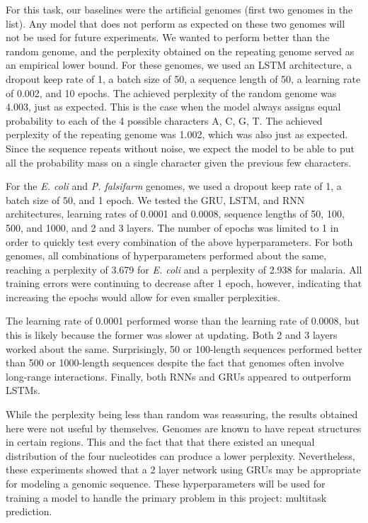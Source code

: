 \documentclass{article} %
\begin{document}
For this task, our baselines were the artificial genomes (first two genomes in the list). Any model that does not perform as expected on these two genomes will not be used for future experiments. We wanted to perform better than the random genome, and the perplexity obtained on the repeating genome served as an empirical lower bound. For these genomes, we used an LSTM architecture, a dropout keep rate of 1, a batch size of 50, a sequence length of 50, a learning rate of 0.002, and 10 epochs. The achieved perplexity of the random genome was 4.003, just as expected. This is the case when the model always assigns equal probability to each of the 4 possible characters A, C, G, T. The achieved perplexity of the repeating genome was 1.002, which was also just as expected. Since the sequence repeats without noise, we expect the model to be able to put all the probability mass on a single character given the previous few characters.

For the \textit{E. coli} and \textit{P. falsifarm} genomes, we used a dropout keep rate of 1, a batch size of 50, and 1 epoch. We tested the GRU, LSTM, and RNN architectures, learning rates of 0.0001 and 0.0008, sequence lengths of 50, 100, 500, and 1000, and 2 and 3 layers. The number of epochs was limited to 1 in order to quickly test every combination of the above hyperparameters. For both genomes, all combinations of hyperparameters performed about the same, reaching a perplexity of 3.679 for \textit{E. coli} and a perplexity of 2.938 for malaria. All training errors were continuing to decrease after 1 epoch, however, indicating that increasing the epochs would allow for even smaller perplexities.

The learning rate of 0.0001 performed worse than the learning rate of 0.0008, but this is likely because the former was slower at updating. Both 2 and 3 layers worked about the same. Surprisingly, 50 or 100-length sequences performed better than 500 or 1000-length sequences despite the fact that genomes often involve long-range interactions. Finally, both RNNs and GRUs appeared to outperform LSTMs.

While the perplexity being less than random was reassuring, the results obtained here were not useful by themselves. Genomes are known to have repeat structures in certain regions. This and the fact that that there existed an unequal distribution of the four nucleotides can produce a lower perplexity. Nevertheless, these experiments showed that a 2 layer network using GRUs may be appropriate for modeling a genomic sequence. These hyperparameters will be used for training a model to handle the primary problem in this project: multitask prediction.
\end{document}
